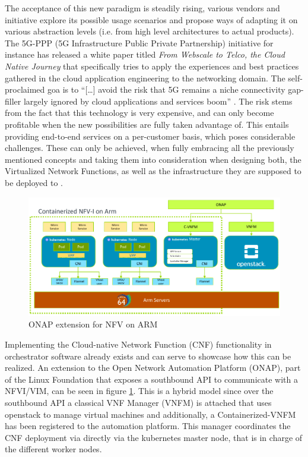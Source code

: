 The acceptance of this new paradigm is steadily rising, various vendors and initiative explore its possible usage scenarios and propose ways of adapting it on various abstraction levels (i.e. from high level architectures to actual products). 
The 5G-PPP (5G Infrastructure Public Private Partnership) initiative for instance has released a white paper titled \textit{From Webscale to Telco, the Cloud Native Journey} \cite{5gppp} that specifically tries to apply the experiences and best practices gathered in the cloud application engineering to the networking domain. The self-proclaimed goa is to ``[\dots] avoid the risk that 5G remains a niche connectivity gap-filler largely ignored by cloud applications and services boom'' \cite{5gppp}. The risk stems from the fact that this technology is very expensive, and can only become profitable when the new possibilities are fully taken advantage of. This entails providing end-to-end services on a per-customer basis, which poses considerable challenges. These can only be achieved, when fully embracing all the previously mentioned concepts and taking them into consideration when designing both, the Virtualized Network Functions, as well as the infrastructure they are supposed to be deployed to \cite{5ggp}.




\begin{figure}[h]
	\includegraphics[width=\linewidth]{images/nfv4arm.png}
	\caption{ONAP extension for NFV on ARM \cite{nfv4arm}}
	\label{fig:nfv4arm}
\end{figure}

Implementing the Cloud-native Network Function (CNF) functionality in orchestrator software already exists and can serve to showcase how this can be realized. An extension to the Open Network Automation Platform (ONAP), part of the Linux Foundation that exposes a southbound API to communicate with a NFVI/VIM, can be seen in figure \ref{fig:nfv4arm}. This is a hybrid model since over the southbound API a classical VNF Manager (VNFM) is attached that uses openstack to manage virtual machines and additionally, a Containerized-VNFM has been registered to the automation platform. This manager coordinates the CNF deployment via directly via the kubernetes master node, that is in charge of the different worker nodes. 



